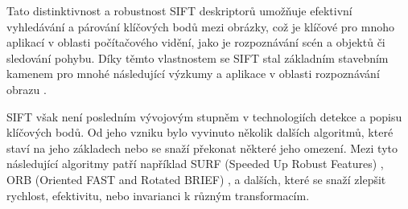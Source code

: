Tato distinktivnost a robustnost SIFT deskriptorů umožňuje efektivní vyhledávání a párování klíčových bodů mezi obrázky, což je klíčové pro mnoho aplikací v oblasti počítačového vidění, jako je rozpoznávání scén a objektů či sledování pohybu. Díky těmto vlastnostem se SIFT stal základním stavebním kamenem pro mnohé následující výzkumy a aplikace v oblasti rozpoznávání obrazu \cite{sift}.

SIFT však není posledním vývojovým stupněm v technologiích detekce a popisu klíčových bodů. Od jeho vzniku bylo vyvinuto několik dalších algoritmů, které staví na jeho základech nebo se snaží překonat některé jeho omezení. Mezi tyto následující algoritmy patří například SURF (Speeded Up Robust Features) \cite{surf}, ORB (Oriented FAST and Rotated BRIEF) \cite{orb}, a dalších, které se snaží zlepšit rychlost, efektivitu, nebo invarianci k různým transformacím.
\endinput